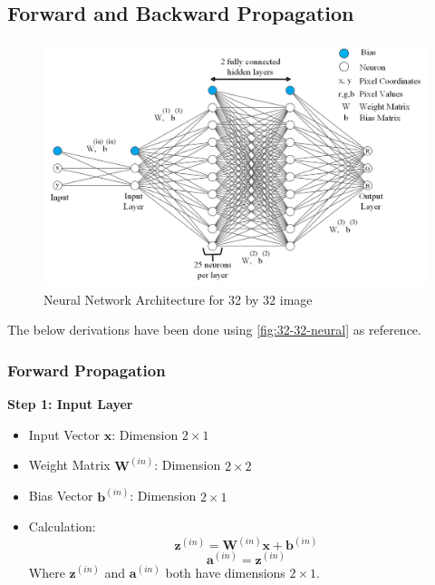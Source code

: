 \pagebreak


\setcounter{subsection}{1}
\subsection{Forward and Backward Propagation}
\label{app:forward-backward-eqn}

\begin{figure}[H]
    \centering
    \includegraphics[width=\linewidth]{assets/32_32_neural.png}
    \caption{Neural Network Architecture for 32 by 32 image}
    \label{fig:32-32-neural}
\end{figure}

The below derivations have been done using \autoref{fig:32-32-neural} as reference.
\subsubsection{Forward Propagation}
\textbf{Step 1: Input Layer}
\begin{itemize}
  \item Input Vector $\mathbf{x}$: Dimension $2 \times 1$
  \item Weight Matrix $\mathbf{W}^{(in)}$: Dimension $2 \times 2$
  \item Bias Vector $\mathbf{b}^{(in)}$: Dimension $2 \times 1$
  \item Calculation:
  \begin{equation}
  \mathbf{z}^{(in)} = \mathbf{W}^{(in)} \mathbf{x} + \mathbf{b}^{(in)}
  \end{equation}
  \begin{equation}
  \mathbf{a}^{(in)} = \mathbf{z}^{(in)}
  \end{equation}
  Where $\mathbf{z}^{(in)}$ and $\mathbf{a}^{(in)}$ both have dimensions $2 \times 1$.
\end{itemize}



